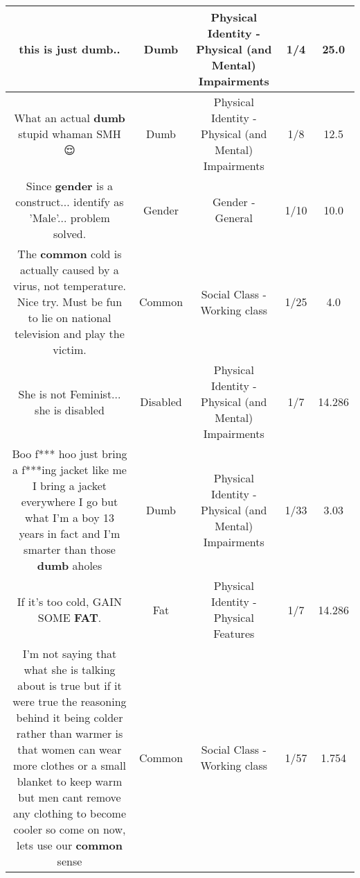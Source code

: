 \documentclass[11pt]{article}
\newlength\mylength
\begin{document}
\begin{center}
\begin{longtable}{|C{.65\mylength}|C{.30\mylength}|C{.12\mylength}|C{.12\mylength}|C{.12\mylength}|}
  \small this is just \textbf{dumb}..\normalsize   & Dumb & Physical Identity - Physical (and Mental) Impairments & 1/4 & 25.0 \\  \hline
  \small What an actual \textbf{dumb} stupid whaman SMH 😌\normalsize   & Dumb & Physical Identity - Physical (and Mental) Impairments & 1/8 & 12.5 \\  \hline
  \small Since \textbf{gender} is a construct... identify as 'Male'... problem solved.\normalsize   & Gender & Gender - General & 1/10 & 10.0 \\  \hline
  \small The \textbf{common} cold is actually caused by a virus, not temperature. Nice try. Must be fun to lie on national television and play the victim.\normalsize   & Common & Social Class - Working class & 1/25 & 4.0 \\  \hline
  \small She is not  Feminist... she is disabled\normalsize   & Disabled & Physical Identity - Physical (and Mental) Impairments & 1/7 & 14.286 \\  \hline
  \small Boo f*** hoo just bring a f***ing jacket like me I bring a jacket everywhere I go but what I'm a boy 13 years in fact and I'm smarter than those \textbf{dumb} aholes\normalsize   & Dumb & Physical Identity - Physical (and Mental) Impairments & 1/33 & 3.03 \\  \hline
  \small If it's too cold, GAIN SOME \textbf{FAT}.\normalsize   & Fat & Physical Identity - Physical Features & 1/7 & 14.286 \\  \hline
  \small I'm not saying that what she is talking about is true but if it were true the reasoning behind it being colder rather than warmer is that women can wear more clothes or a small blanket to keep warm but men cant remove any clothing to become cooler so come on now, lets use our \textbf{common} sense\normalsize   & Common & Social Class - Working class & 1/57 & 1.754 \\  \hline

\end{longtable}
\end{center}
\end{document}
